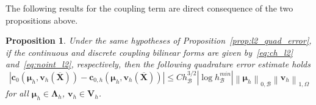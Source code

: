 \documentclass[oneside]{amsart} %
\newcommand{\norm}[1]{\left\lVert#1\right\rVert}
\newcommand{\abs}[1]{\left\lvert#1\right\rvert}
\newtheorem{prop}{Proposition}
\newcommand\B{\mathcal B} %
\renewcommand\v{\mathbf{v}} %
\renewcommand\c{\mathbf{c}} %
\newcommand\X{\mathbf{X}} %
\newcommand\Xbar{\overline{\X}} %
\newcommand\LL{{\boldsymbol{\Lambda}}} %
\newcommand\Vline{\mathbf{V}} %
\newcommand\mmu{{\boldsymbol\mu}} %
\renewcommand\lg{\begin{color}{black}}
\begin{document}
	
	The following results for the coupling term are direct consequence of the two propositions above.
	
	\begin{prop}\label{prop:l2_final}
		Under the same hypotheses of Proposition~\ref{prop:l2_quad_error}, if the continuous and discrete coupling bilinear forms are given by~\eqref{eq:ch_l2} and~\eqref{eq:noint_l2}, respectively, then the following quadrature error estimate holds
		\begin{equation}\label{eq:l2_est_fin}
			\abs{\c_0(\mmu_h,\v_h(\Xbar))-\c_{0,h}(\mmu_h,\v_h(\Xbar))} \le
			C h_\B^{3/2}|\log h_\B^{min}| \norm{\mmu_h}_{0,\B}\norm{\v_h}_{1,\Omega}
		\end{equation}
		for all $\mmu_h\in\LL_h$, $\v_h\in\Vline_h$.
	\end{prop}
	
\end{document}
